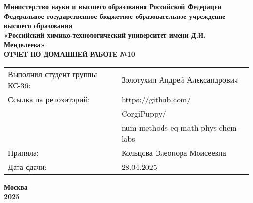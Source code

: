 \documentclass[12pt, a4paper]{report}
\begin{document}
	\begin{titlepage}
		\begin{center}
			\large \textbf{Министерство науки и высшего образования Российской Федерации} \\
			\large \textbf{Федеральное государственное бюджетное образовательное учреждение высшего образования} \\
			\large \textbf{«Российский химико-технологический университет имени Д.И. Менделеева»} \\

			\vspace*{4cm}
			\LARGE \textbf{ОТЧЕТ ПО ДОМАШНЕЙ РАБОТЕ №10}

			\vspace*{4cm}
			\begin{flushright}
				\Large
				\begin{tabular}{>{\raggedleft\arraybackslash}p{9cm} p{10cm}}
					Выполнил студент группы КС-36: & Золотухин Андрей Александрович \\
					Ссылка на репозиторий: & https://github.com/ \\
					& CorgiPuppy/ \\
					& num-methods-eq-math-phys-chem-labs \\
					Приняла: & Кольцова Элеонора Моисеевна \\
					Дата сдачи: & 28.04.2025 \\
				\end{tabular}
			\end{flushright}

			\vspace*{6cm}
			\Large \textbf{Москва \\ 2025}
		\end{center}
	\end{titlepage}

	\tableofcontents
	\thispagestyle{empty}
	\newpage

\end{document}
